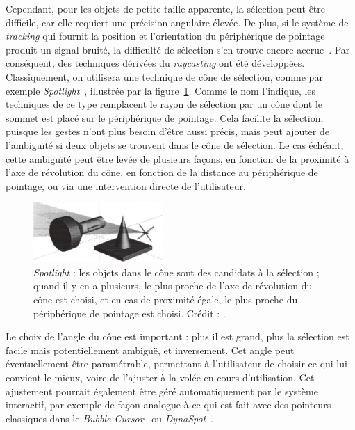 	Cependant, pour les objets de petite taille apparente, la sélection peut être difficile, car elle requiert une précision angulaire élevée. De plus, si le système de \emph{tracking} qui fournit la position et l'orientation du périphérique de pointage produit un signal bruité, la difficulté de sélection s'en trouve encore accrue~\cite{argelaguet2013survey}. Par conséquent, des techniques dérivées du \emph{raycasting} ont été développées. Classiquement, on utilisera une technique de cône de sélection, comme par exemple \emph{Spotlight}~\cite{liang1994jdcad}, illustrée par la figure~\ref{fig:spotlight}. Comme le nom l'indique, les techniques de ce type remplacent le rayon de sélection par un cône dont le sommet est placé sur le périphérique de pointage. Cela facilite la sélection, puisque les gestes n'ont plus besoin d'être aussi précis, mais peut ajouter de l'ambiguïté si deux objets se trouvent dans le cône de sélection. Le cas échéant, cette ambiguïté peut être levée de plusieurs façons, en fonction de la proximité à l'axe de révolution du cône, en fonction de la distance au périphérique de pointage, ou via une intervention directe de l'utilisateur.
	
	\begin{figure}
		\centering
		\includegraphics[width=0.44\textwidth]{figures/ch2/spotlight}
		\caption[Cône de sélection : \emph{Spotlight}]{\emph{Spotlight} : les objets dans le cône sont des candidats à la sélection ; quand il y en a plusieurs, le plus proche de l'axe de révolution du cône est choisi, et en cas de proximité égale, le plus proche du périphérique de pointage est choisi. Crédit : \cite{liang1994jdcad}.}
		\label{fig:spotlight}
	\end{figure}
	
	Le choix de l'angle du cône est important : plus il est grand, plus la sélection est facile mais potentiellement ambiguë, et inversement. Cet angle peut éventuellement être paramétrable, permettant à l'utilisateur de choisir ce qui lui convient le mieux, voire de l'ajuster à la volée en cours d'utilisation. Cet ajustement pourrait également être géré automatiquement par le système interactif, par exemple de façon analogue à ce qui est fait avec des pointeurs classiques dans le \emph{Bubble Cursor}~\cite{grossman2005bubble} ou \emph{DynaSpot}~\cite{chapuis2009dynaspot}.
	
